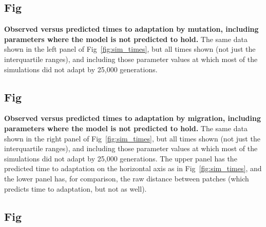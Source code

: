 \documentclass[10pt,letterpaper]{article}
\begin{document}

\subsection{Fig}
\label{sfig:sim_migration_times}

      \textbf{Observed versus predicted times to adaptation by mutation, 
      including parameters where the model is not predicted to hold.}
    The same data shown in the left panel of Fig~\ref{fig:sim_times},
    but all times shown (not just the interquartile ranges),
    and including those parameter values at which most of the simulations did not adapt by 25,000 generations.

\subsection{Fig}
\label{sfig:sim_mutation_times}

      \textbf{Observed versus predicted times to adaptation by migration, 
      including parameters where the model is not predicted to hold.}
    The same data shown in the right panel of Fig~\ref{fig:sim_times},
    but all times shown (not just the interquartile ranges),
    and including those parameter values at which most of the simulations did not adapt by 25,000 generations.
    The upper panel has the predicted time to adaptation on the horizontal axis as in Fig~\ref{fig:sim_times},
    and the lower panel has, for comparison, the raw distance between patches 
    (which predicts time to adaptation, but not as well).

\subsection{Fig}
\label{sfig:sims_1}
\end{document}
